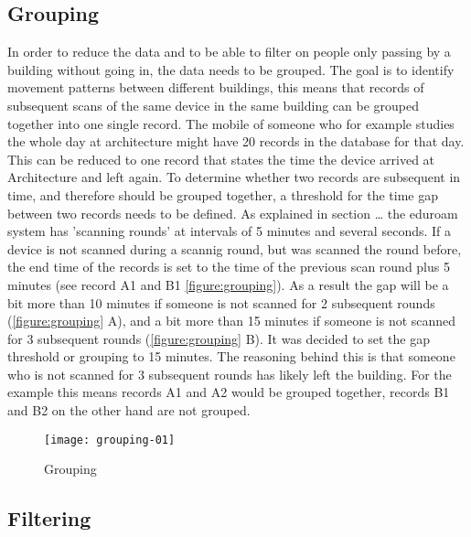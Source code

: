 \subsection{Grouping}\label{grouping}
In order to reduce the data and to be able to filter on people only passing by a building without going in, the data needs to be grouped. The goal is to identify movement patterns between different buildings, this means that records of subsequent scans of the same device in the same building can be grouped together into one single record. The mobile of someone who for example studies the whole day at architecture might have 20 records in the database for that day. This can be reduced to one record that states the time the device arrived at Architecture and left again. To determine whether two records are subsequent in time, and therefore should be grouped together, a threshold for the time gap between two records needs to be defined. As explained in section … the eduroam system has 'scanning rounds' at intervals of 5 minutes and several seconds. If a device is not scanned during a scannig round, but was scanned the round before, the end time of the records is set to the time of the previous scan round plus 5 minutes (see record A1 and B1 \autoref{figure:grouping}). As a result the gap will be a bit more than 10 minutes if someone is not scanned for 2 subsequent rounds (\autoref{figure:grouping} A), and a bit more than 15 minutes if someone is not scanned for 3 subsequent rounds (\autoref{figure:grouping} B). It was decided to set the gap threshold or grouping to 15 minutes. The reasoning behind this is that someone who is not scanned for 3 subsequent rounds has likely left the building. For the example this means records A1 and A2 would be grouped together, records B1 and B2 on the other hand are not grouped.

\begin{figure}[H]
\centering
\texttt{[image: grouping-01]}
\captionsetup{justification=centering}
\caption{Grouping}
\label{figure:grouping}
\end{figure}

\subsection{Filtering}\label{filtering}

